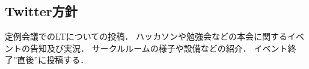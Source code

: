 \subsection*{Twitter方針}

定例会議でのLTについての投稿．
ハッカソンや勉強会などの本会に関するイベントの告知及び実況．
サークルルームの様子や設備などの紹介．
イベント終了”直後”に投稿する．
